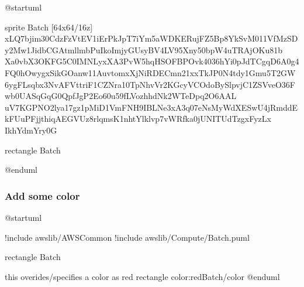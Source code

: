 \documentclass[letterpaper,10pt,english]{sphinxmanual}
\begin{document}
%
\begin{sphinxVerbatim}[commandchars=\\\{\},numbers=left,firstnumber=1,stepnumber=1]
@startuml

sprite \PYGZdl{}Batch [64x64/16z] \PYGZob{}
xLQ7bjim30CdzFzVtEV1iErPkJpT7iYm5aWDKERujFZ5Bp8YkSvM011VfMzSDy2Mw1JidbCGAtmllmbPuIkoImjyGUsyBV4LV95\PYGZus{}Xny50bpW4uTRAjOKu81b
Xa0vbX3OKFG5C0IMNLyxXA\PYGZus{}3PvW5hqHSOFBP\PYGZus{}Ovk4036hYi0pJdTCgqD6A0g4FQ0hOwygxSikGOanw11AuvtomxXjNiRDECmn21xxTkJP0N4tdy1Gmu5T2GW
6ygFL\PYGZus{}sqbx3NvA\PYGZus{}FVtt\PYGZus{}ri\PYGZus{}F1CZNra\PYGZhy{}10TpNhvVr2KGcyVCOdoBySlpv\PYGZhy{}jC1ZSVveO36\PYGZus{}Fwb0UASqGqG0QpfJgP2Eo60u59\PYGZhy{}fLVozhhdNk2WTeDpq2O6AAL\PYGZus{}
uV7KGPNO2lya17gz1pMiD1VmFNH9IBLNe3xA3q07eNsMy\PYGZus{}WdXESwU4jRmddEk\PYGZhy{}FUuPFjjthiqAEGVUz8rlqmsK1nhtYlklvp7vWRfka0jUNITUdTzgxFyzLx
\PYGZhy{}Ikh\PYGZus{}YdmYr\PYGZus{}y0G
\PYGZcb{}

rectangle \PYGZdq{}\PYGZlt{}\PYGZdl{}Batch\PYGZgt{}\PYGZdq{}

@enduml
\end{sphinxVerbatim}
\sphinxresetverbatimhllines


\subsubsection{Add some color}
\label{\detokenize{StdlibUnderTheHood/StdlibUnderstanding:add-some-color}}
\begin{figure}[htbp]
\centering

\end{figure}

%
\begin{sphinxVerbatim}[commandchars=\\\{\},numbers=left,firstnumber=1,stepnumber=1]
@startuml 

!include \PYGZlt{}awslib/AWSCommon\PYGZgt{}
!include \PYGZlt{}awslib/Compute/Batch.puml\PYGZgt{}

rectangle \PYGZdq{}\PYGZlt{}\PYGZdl{}Batch\PYGZgt{}\PYGZdq{} 

\PYGZsq{}this overides/specifies a color as red
rectangle \PYGZdq{}\PYGZlt{}color:red\PYGZgt{}\PYGZlt{}\PYGZdl{}Batch\PYGZgt{}\PYGZlt{}/color\PYGZgt{}\PYGZdq{}
@enduml
\end{sphinxVerbatim}
\sphinxresetverbatimhllines
\end{document}
